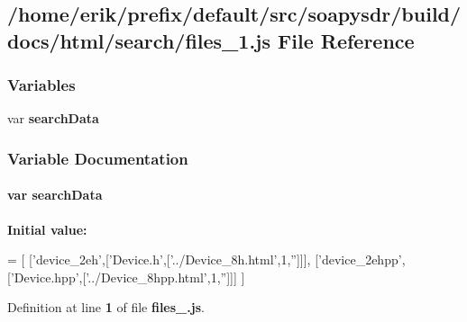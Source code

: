 \subsection{/home/erik/prefix/default/src/soapysdr/build/docs/html/search/files\+\_\+1.js File Reference}
\label{files__1_8js}
\subsubsection*{Variables}
\begin{DoxyCompactItemize}
\item 
var {\bf search\+Data}
\end{DoxyCompactItemize}


\subsubsection{Variable Documentation}
\paragraph[{search\+Data}]{\setlength{\rightskip}{0pt plus 5cm}var search\+Data}\label{files__1_8js_ad01a7523f103d6242ef9b0451861231e}
{\bfseries Initial value\+:}
\begin{DoxyCode}
=
[
  [\textcolor{stringliteral}{'device\_2eh'},[\textcolor{stringliteral}{'Device.h'},[\textcolor{stringliteral}{'../Device\_8h.html'},1,\textcolor{stringliteral}{''}]]],
  [\textcolor{stringliteral}{'device\_2ehpp'},[\textcolor{stringliteral}{'Device.hpp'},[\textcolor{stringliteral}{'../Device\_8hpp.html'},1,\textcolor{stringliteral}{''}]]]
]
\end{DoxyCode}


Definition at line {\bf 1} of file {\bf files\+\_.\+js}.

